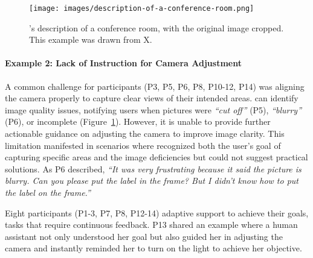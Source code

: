 \begin{figure}[t!]
\centering
\texttt{[image: images/description-of-a-conference-room.png]}
\caption{\bma's description of a conference room, with the original image cropped. This example was drawn from X.}
\label{incomplete_info}
\end{figure}

\paragraph{Example 2: Lack of Instruction for Camera Adjustment}
\label{adjust_camera}

A common challenge for participants (P3, P5, P6, P8, P10-12, P14) was aligning the camera properly to capture clear views of their intended areas. 
\bma{} can identify image quality issues, notifying users when pictures were \textit{``cut off''} (P5), \textit{``blurry''} (P6), or incomplete (Figure~\ref{incomplete_info}).  
% 
However, it is unable to provide further actionable guidance on adjusting the camera to improve image clarity. 
% 
This limitation manifested in scenarios where \sbma{} recognized both the user's goal of capturing specific areas and the image deficiencies but could not suggest practical solutions. 
As P6 described, \textit{``It was very frustrating because it said the picture is blurry. Can you please put the label in the frame? But I didn't know how to put the label on the frame.''} 








Eight participants (P1-3, P7, P8, P12-14)  adaptive support to achieve their goals,  tasks that require continuous feedback. P13 shared an example where a human assistant not only understood her goal but also guided her in adjusting the camera and instantly reminded her to turn on the light to achieve her objective.

